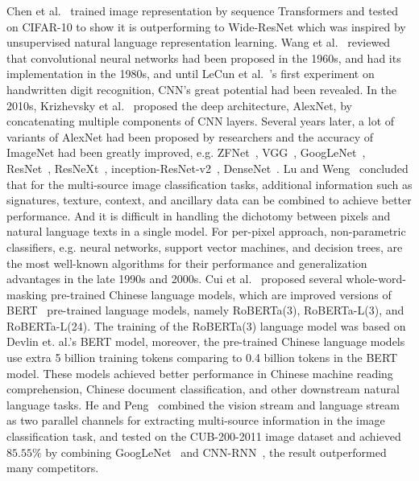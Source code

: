 \documentclass[runningheads]{llncs}
\begin{document}
  Chen et al.~\cite{chen2020generative} trained image representation by sequence Transformers and tested on CIFAR-10 to show it is outperforming to Wide-ResNet
which was inspired by unsupervised natural language representation learning.
  Wang et al.~\cite{wang2019development} reviewed that convolutional neural networks had been proposed in the 1960s, and had its implementation in the 1980s,
and until LeCun et al.~\cite{lecun1990handwritten}'s first experiment on handwritten digit recognition, CNN's great potential had been revealed.
  In the 2010s, Krizhevsky et al.~\cite{krizhevsky2012imagenet} proposed the deep architecture, AlexNet, by concatenating multiple components of CNN layers.
Several years later, a lot of variants of AlexNet had been proposed by researchers and the accuracy of ImageNet had been greatly improved, e.g. ZFNet~\cite{zeiler2014visualizing}, VGG~\cite{simonyan2014very}, GoogLeNet~\cite{szegedy2015going}, ResNet~\cite{he2016deep},
  ResNeXt~\cite{xie2017aggregated}, inception-ResNet-v2~\cite{szegedy2016inception}, DenseNet~\cite{huang2016deep}.
  Lu and Weng~\cite{lu2007survey} concluded that for the multi-source image classification tasks, additional information such as signatures, texture, context, and ancillary data can be combined to achieve better performance.
And it is difficult in handling the dichotomy between pixels and natural language texts in a single model. For per-pixel approach, non-parametric classifiers, e.g. neural networks, support vector machines, and decision trees,
are the most well-known algorithms for their performance and generalization advantages in the late 1990s and 2000s.
  Cui et al.~\cite{cui2020revisiting} proposed several whole-word-masking pre-trained Chinese language models,
which are improved versions of BERT~\cite{devlin2019bert} pre-trained language models, namely RoBERTa(3), RoBERTa-L(3), and RoBERTa-L(24). The training of the RoBERTa(3) language model was based on Devlin et. al.'s BERT model,
moreover, the pre-trained Chinese language models use extra 5 billion training tokens comparing to 0.4 billion tokens in the BERT model.
These models achieved better performance in Chinese machine reading comprehension, Chinese document classification, and other downstream natural language tasks.
  He and Peng~\cite{he2017fine} combined the vision stream and language stream as two parallel channels for extracting multi-source information in the image classification task,
and tested on the CUB-200-2011 image dataset and achieved $85.55\%$ by combining GoogLeNet~\cite{szegedy2015going} and CNN-RNN~\cite{reed2016learning}, the result outperformed many competitors.
\end{document}
